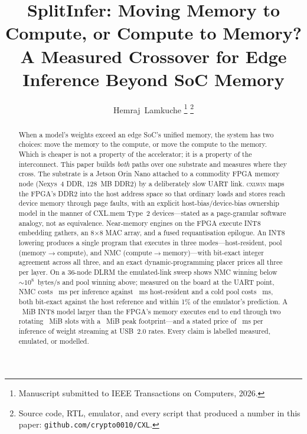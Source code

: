 \documentclass[lettersize,journal]{IEEEtran}
\newcommand{\cxlwin}{\textsc{cxlwin}}
\begin{document}
\title{SplitInfer: Moving Memory to Compute, or Compute to Memory?\\
A Measured Crossover for Edge Inference Beyond SoC Memory}

\author{Hemraj~Lamkuche
\thanks{Manuscript submitted to IEEE Transactions on Computers, 2026.}
\thanks{Source code, RTL, emulator, and every script that produced a number in this paper: \texttt{github.com/crypto0010/CXL}.}}

\maketitle

\begin{abstract}
When a model's weights exceed an edge SoC's unified memory, the system has two choices: move the memory to the compute, or move the compute to the memory. Which is cheaper is not a property of the accelerator; it is a property of the interconnect. This paper builds \emph{both} paths over one substrate and measures where they cross. The substrate is a Jetson Orin Nano attached to a commodity FPGA memory node (Nexys~4 DDR, 128~MB DDR2) by a deliberately slow UART link. \cxlwin{} maps the FPGA's DDR2 into the host address space so that ordinary loads and stores reach device memory through page faults, with an explicit host-bias/device-bias ownership model in the manner of CXL.mem Type~2 devices---stated as a page-granular software analogy, not as equivalence. Near-memory engines on the FPGA execute INT8 embedding gathers, an 8$\times$8 MAC array, and a fused requantisation epilogue. An INT8 lowering produces a single program that executes in three modes---host-resident, pool (memory$\rightarrow$compute), and NMC (compute$\rightarrow$memory)---with bit-exact integer agreement across all three, and an exact dynamic-programming placer prices all three per layer. On a 36-node DLRM the emulated-link sweep shows NMC winning below ${\sim}10^8$~bytes/s and pool winning above; measured on the board at the UART point, NMC costs \MUsbSInmcMedian~ms per inference against \MEmulSIhostMedian~ms host-resident and a cold pool costs \MUsbSIpoolcoldMedian~ms, both bit-exact against the host reference and within 1\% of the emulator's prediction. A \PMlpEightTotalWeightMiB~MiB INT8 model larger than the FPGA's memory executes end to end through two rotating \PMlpEightSlotMiB~MiB slots with a \PMlpEightLayoutMiB~MiB peak footprint---and a stated price of \EsevennmcusbtwoStream~ms per inference of weight streaming at USB~2.0 rates. Every claim is labelled measured, emulated, or modelled.
\end{abstract}
\end{document}

